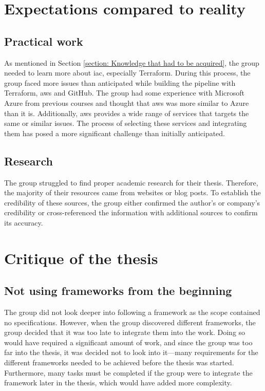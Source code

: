 \section{Expectations compared to reality}
\subsection{Practical work}
As mentioned in Section \ref{section: Knowledge that had to be acquired}, the group needed to learn more about \gls{iac}, especially Terraform. During this process, the group faced more issues than anticipated while building the \gls{pipeline} with Terraform, \acrshort{aws} and GitHub. The group had some experience with Microsoft Azure from previous courses and thought that \acrshort{aws} was more similar to Azure than it is. Additionally, \acrshort{aws} provides a wide range of services that targets the same or similar issues. The process of selecting these services and integrating them has posed a more significant challenge than initially anticipated. 

\subsection{Research}
The group struggled to find proper academic research for their thesis. Therefore, the majority of their resources came from websites or blog posts. To establish the credibility of these sources, the group either confirmed the author's or company's credibility or cross-referenced the information with additional sources to confirm its accuracy. 


\section{Critique of the thesis}

\subsection{Not using frameworks from the beginning}
The group did not look deeper into following a framework as the scope contained no specifications. However, when the group discovered different frameworks, the group decided that it was too late to integrate them into the work. Doing so would have required a significant amount of work, and since the group was too far into the thesis, it was decided not to look into it—many requirements for the different frameworks needed to be achieved before the thesis was started. Furthermore, many tasks must be completed if the group were to integrate the framework later in the thesis, which would have added more complexity. 

